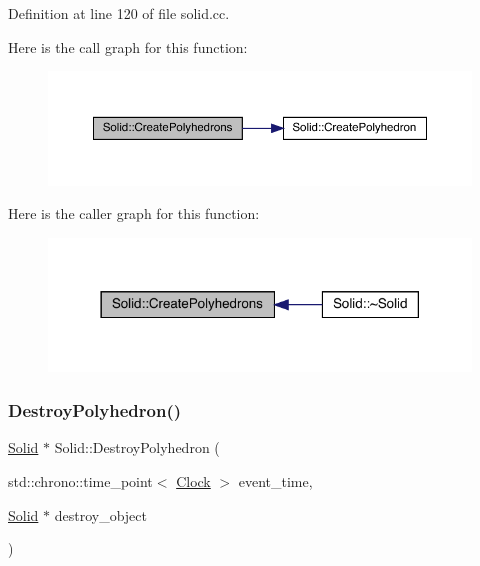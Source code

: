 Definition at line 120 of file solid.\+cc.

Here is the call graph for this function\+:
\nopagebreak
\begin{figure}[H]
\begin{center}
\leavevmode
\includegraphics[width=350pt]{class_solid_a40b2ea07e384aff138ba139c3c84f525_cgraph}
\end{center}
\end{figure}
Here is the caller graph for this function\+:
\nopagebreak
\begin{figure}[H]
\begin{center}
\leavevmode
\includegraphics[width=318pt]{class_solid_a40b2ea07e384aff138ba139c3c84f525_icgraph}
\end{center}
\end{figure}
\mbox{\label{class_solid_a0841900d8ef4b82292ac027c4852b59b}} 
\subsubsection{\texorpdfstring{Destroy\+Polyhedron()}{DestroyPolyhedron()}}
{\footnotesize\ttfamily \hyperlink{class_solid}{Solid} $\ast$ Solid\+::\+Destroy\+Polyhedron (\begin{DoxyParamCaption}\item[{std\+::chrono\+::time\+\_\+point$<$ \hyperlink{universe_8h_a0ef8d951d1ca5ab3cfaf7ab4c7a6fd80}{Clock} $>$}]{event\+\_\+time,  }\item[{\hyperlink{class_solid}{Solid} $\ast$}]{destroy\+\_\+object }\end{DoxyParamCaption})}




